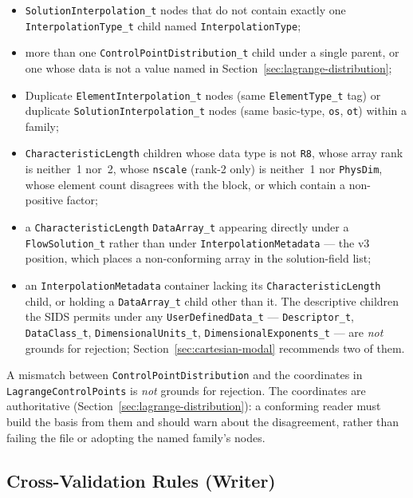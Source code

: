 \documentclass[11pt,letterpaper]{article}
\newif\ifvfourdraft
\newcommand{\vfour}[1]{\ifvfourdraft\textcolor{v4violet}{#1}\else#1\fi}
\begin{document}
\begin{itemize}
{    \texttt{ParametricMonomialsPascal}, \texttt{CartesianMonomialsPascal} or
    \texttt{IsoParametric}, none of which stores one;}
  \item \texttt{SolutionInterpolation\_t} nodes that do not contain exactly one
    \texttt{InterpolationType\_t} child named \texttt{InterpolationType};
  \item more than one \texttt{ControlPointDistribution\_t} child under a single
    parent, or one whose data is not a value named in
    Section~\ref{sec:lagrange-distribution};
  \item Duplicate \texttt{ElementInterpolation\_t} nodes (same \texttt{ElementType\_t} tag) or
    duplicate \texttt{SolutionInterpolation\_t} nodes (same basic-type, \texttt{os},
    \texttt{ot}) within a family;
  \item \texttt{CharacteristicLength} children whose data type is not \texttt{R8}, whose
    array rank is neither~1 nor~2, whose \texttt{nscale} (rank-2 only) is neither~1 nor
    \texttt{PhysDim}, whose element count disagrees with the block, or which contain a
    non-positive factor;
  \item \vfour{a \texttt{CharacteristicLength} \texttt{DataArray\_t} appearing directly
    under a \texttt{FlowSolution\_t} rather than under
    \texttt{InterpolationMetadata} --- the v3 position, which places a
    non-conforming array in the solution-field list;}
  \item \vfour{an \texttt{InterpolationMetadata} container lacking its
    \texttt{CharacteristicLength} child, or holding a \texttt{DataArray\_t} child
    other than it.  The descriptive children the SIDS permits under any
    \texttt{UserDefinedData\_t} --- \texttt{Descriptor\_t}, \texttt{DataClass\_t},
    \texttt{DimensionalUnits\_t}, \texttt{DimensionalExponents\_t} --- are
    \emph{not} grounds for rejection; Section~\ref{sec:cartesian-modal} recommends
    two of them.}
\end{itemize}

\noindent A mismatch between
\texttt{Control\-Point\-Distribution}\allowbreak{} and the coordinates in
\texttt{Lagrange\-Control\-Points} is \emph{not} grounds for rejection.  The coordinates are
authoritative (Section~\ref{sec:lagrange-distribution}): a conforming reader must build the
basis from them and should warn about the disagreement, rather than failing the file or
adopting the named family's nodes.

\subsection{Cross-Validation Rules (Writer)}
\end{document}
